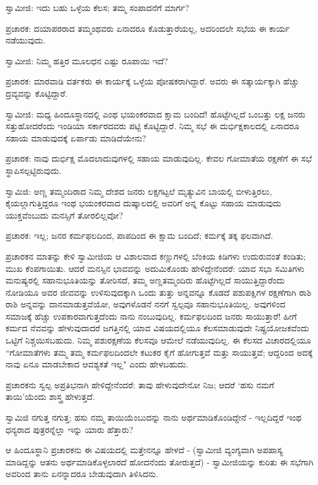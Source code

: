 ಸ್ವಾಮೀಜಿ: ಇದು ಬಹು ಒಳ್ಳೆಯ ಕೆಲಸ; ತಮ್ಮ ಸಂಪಾದನೆಗೆ ಮಾರ್ಗ?

ಪ್ರಚಾರಕ: ದಯಾಪರರಾದ ತಮ್ಮಂಥವರು ಏನಾದರೂ ಕೊಡುತ್ತಾರೆಯಲ್ಲ, ಅದರಿಂದಲೇ ಸಭೆಯ ಈ ಕಾರ್ಯ ನಡೆಯುವುದು.

ಸ್ವಾಮೀಜಿ: ನಿಮ್ಮ ಹತ್ತಿರ ಮೂಲಧನ ಎಷ್ಟು ರೂಪಾಯಿ ಇದೆ?

ಪ್ರಚಾರಕ: ಮಾರವಾಡಿ ವರ್ತಕರು ಈ ಕಾರ್ಯಕ್ಕೆ ಒಳ್ಳೆಯ ಪೋಷಕರಾಗಿದ್ದಾರೆ. ಅವರು ಈ ಸತ್ಕಾರ್ಯಕ್ಕಾಗಿ ಹೆಚ್ಚು ದ್ರವ್ಯವನ್ನು ಕೊಟ್ಟಿದ್ದಾರೆ.

ಸ್ವಾಮೀಜಿ: ಮಧ್ಯ ಹಿಂದೂಸ್ಥಾನದಲ್ಲಿ ಎಂಥ ಭಯಂಕರವಾದ ಕ್ಷಾಮ ಬಂದಿದೆ! ಹೊಟ್ಟೆಗಿಲ್ಲದೆ ಒಂಬತ್ತು ಲಕ್ಷ ಜನರು ಸತ್ತುಹೋದರೆಂದು ಇಂಡಿಯಾ ಸರ್ಕಾರದವರು ಪಟ್ಟಿ ಕೊಟ್ಟಿದ್ದಾರೆ. ನಿಮ್ಮ ಸಭೆ ಈ ದುರ್ಭಿಕ್ಷಕಾಲದಲ್ಲಿ ಏನಾದರೂ ಸಹಾಯ ಮಾಡುವುದಕ್ಕೆ ಏರ್ಪಾಡು ಮಾಡಿದೆಯೇನು?

ಪ್ರಚಾರಕ: ನಾವು ದುರ್ಭಿಕ್ಷ ಮೊದಲಾದುವುಗಳಲ್ಲಿ ಸಹಾಯ ಮಾಡುವುದಿಲ್ಲ. ಕೇವಲ ಗೋಮಾತೆಯ ರಕ್ಷಣೆಗೆ ಈ ಸಭೆ ಸ್ಥಾಪಿಸಲ್ಪಟ್ಟಿರುವುದು.

ಸ್ವಾಮಿಜಿ: ಅಣ್ಣ ತಮ್ಮಂದಿರಾದ ನಿಮ್ಮ ದೇಶದ ಜನರು ಲಕ್ಷಗಟ್ಟಲೆ ಮೃತ್ಯುವಿನ ಬಾಯಲ್ಲಿ ಬೀಳುತ್ತಿರಲು, ಕೈಯಲ್ಲಾಗುತ್ತಿದ್ದರೂ ಇಂಥ ಭಯಂಕರವಾದ ದುಷ್ಕಾಲದಲ್ಲಿ ಅವರಿಗೆ ಅನ್ನ ಕೊಟ್ಟು ಸಹಾಯ ಮಾಡುವುದು ಯುಕ್ತವೆಂಬುದು ಮನಸ್ಸಿಗೆ ತೋರಲಿಲ್ಲವೋ?

ಪ್ರಚಾರಕ: ಇಲ್ಲ; ಜನರ ಕರ್ಮಫಲದಿಂದ, ಪಾಪದಿಂದ ಈ ಕ್ಷಾಮ ಬಂದಿದೆ; ಕರ್ಮಕ್ಕೆ ತಕ್ಕ ಫಲವಾಗಿದೆ.

ಪ್ರಚಾರಕನ ಮಾತನ್ನು ಕೇಳಿ ಸ್ವಾಮೀಜಿಯ ಆ ವಿಶಾಲವಾದ ಕಣ್ಣುಗಳಲ್ಲಿ ಬೆಂಕಿಯ ಕಿಡಿಗಳು ಉದುರುವಂತೆ ಕಂಡಿತು; ಮುಖ ಕೆಂಪಗಾಯಿತು. ಆದರೆ ಮನಸ್ಸಿನ ಭಾವವನ್ನು ಅದುಮಿಕೊಂಡು ಹೇಳಿದ್ದೇನೆಂದರೆ: ಯಾವ ಸಭಾ ಸಮಿತಿಗಳು ಮನುಷ್ಯರಲ್ಲಿ ಸಹಾನುಭೂತಿಯನ್ನು ತೋರಿಸದೆ, ತಮ್ಮ ಅಣ್ಣತಮ್ಮಂದಿರು ಹೊಟ್ಟೆಗಿಲ್ಲದೆ ಸಾಯುತ್ತಿದ್ದಾರೆಂದು ನೋಡಿಯೂ ಅವರ ಜೀವವನ್ನು ಉಳಿಸುವುದಕ್ಕಾಗಿ ಒಂದು ತುತ್ತು ಅನ್ನವನ್ನೂ ಕೊಡದೆ ಪಶುಪಕ್ಷಿಗಳ ರಕ್ಷಣೆಗಾಗಿ ರಾಶಿ ರಾಶಿ ಅನ್ನವನ್ನು ದಾನಮಾಡುತ್ತವೆಯೋ, ಅವುಗಳೊಡನೆ ನನಗೆ ಸ್ವಲ್ಪವೂ ಸಹಾನುಭೂತಿಯಿಲ್ಲ. ಅವುಗಳಿಂದ ಸಮಾಜಕ್ಕೆ ಹೆಚ್ಚು ಉಪಕಾರವಾಗುತ್ತದೆಂದು ನಾನು ನಂಬುವುದಿಲ್ಲ. ಕರ್ಮಫಲದಿಂದ ಜನರು ಸಾಯುತ್ತಾರೆ! ಹೀಗೆ ಕರ್ಮದ ನೆವವನ್ನು ಹೇಳುವುದಾದರೆ ಜಗತ್ತಿನಲ್ಲಿ ಯಾವ ವಿಷಯದಲ್ಲಿಯೂ ಕೆಲಸಮಾಡುವುದೇ ನಿಷ್ಪ್ರಯೋಜಕವೆಂದು ಒಟ್ಟಿಗೆ ನಿಶ್ಚಯಿಸಬಹುದು. ನಿಮ್ಮ ಪಶುರಕ್ಷಣೆಯ ಕೆಲಸವೂ ಆಮೇಲೆ ನಡೆಯುವುದಿಲ್ಲ. ಈ ಕೆಲಸದ ವಿಚಾರದಲ್ಲಿಯೂ “ಗೋಮಾತೆಗಳು ತಮ್ಮ ತಮ್ಮ ಕರ್ಮಫಲದಿಂದಲೇ ಕಟುಕರ ಕೈಗೆ ಹೋಗುತ್ತವೆ ಮತ್ತು ಸಾಯುತ್ತವೆ; ಆದ್ದರಿಂದ ಅದಕ್ಕೆ ನಾವು ಏನೂ ಮಾಡಬೇಕಾದ ಆವಶ್ಯಕತೆ ಇಲ್ಲ" ಎಂದು ಹೇಳಬಹುದು.

ಪ್ರಚಾರಕನು ಸ್ವಲ್ಪ ಅಪ್ರತಿಭನಾಗಿ ಹೇಳಿದ್ದೇನೆಂದರೆ: ತಾವು ಹೇಳುವುದೇನೋ ನಿಜ; ಆದರೆ ‘ಹಸು ನಮಗೆ ತಾಯಿ’ಯೆಂದು ಶಾಸ್ತ್ರ ಹೇಳುತ್ತದೆ.

ಸ್ವಾಮಿಜಿ ನಗುತ್ತ ನಗುತ್ತ: ಹಸು ನಮ್ಮ ತಾಯಿಯೆಂಬುದನ್ನು ನಾನು ಅರ್ಥಮಾಡಿಕೊಂಡಿದ್ದೇನೆ - ಇಲ್ಲದಿದ್ದರೆ ಇಂಥ ಧನ್ಯರಾದ ಪುತ್ರರನ್ನೆಲ್ಲಾ ಇನ್ನು ಯಾರು ಹೆತ್ತಾರು?

ಆ ಹಿಂದೂಸ್ಥಾನಿ ಪ್ರಚಾರಕನು ಈ ವಿಷಯದಲ್ಲಿ ಮತ್ತೇನನ್ನೂ ಹೇಳದೆ - (ಸ್ವಾಮೀಜಿ ವ್ಯಂಗ್ಯವಾಗಿ ಅಪಹಾಸ್ಯ ಮಾಡಿದ್ದನ್ನು ಆತನು ಅರ್ಥಮಾಡಿಕೊಳ್ಳಲಾರದೆ ಹೋದನೆಂದು ತೋರುತ್ತದೆ) - ಸ್ವಾಮೀಜಿಯನ್ನು ಕುರಿತು ಈ ಸಭೆಗಾಗಿ ಅವರಿಂದ ತಾನು ಏನನ್ನಾದರೂ ಬೇಡುವುದಾಗಿ ತಿಳಿಸಿದನು.

